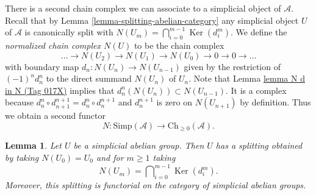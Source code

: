 \documentclass{amsart}
\theoremstyle{plain}
\newtheorem{lemma}[subsection]{Lemma}
\theoremstyle{definition}
\theoremstyle{remark}
\numberwithin{equation}{subsection}
\def\Ker{\mathop{\mathrm{Ker}}}
\begin{document}
\noindent
There is a second chain complex we can associate to
a simplicial object of $\mathcal{A}$. Recall that by
Lemma \ref{lemma-splitting-abelian-category}
any simplicial object $U$ of $\mathcal{A}$
is canonically split with
$N(U_m) = \bigcap_{i = 0}^{m - 1} \Ker(d^m_i)$.
We define the {\it normalized chain complex $N(U)$}
to be the chain complex
$$
\ldots \to N(U_2) \to N(U_1) \to N(U_0) \to 0 \to 0 \to \ldots
$$
with boundary map $d_n : N(U_n) \to N(U_{n - 1})$ given
by the restriction of $(-1)^nd^n_n$ to the direct summand
$N(U_n)$ of $U_n$. Note that Lemma \href{https://stacks.math.columbia.edu/tag/017X}{lemma N d in N (Tag 017X)}
implies that $d^n_n(N(U_n)) \subset N(U_{n - 1})$.
It is a complex because
$d^n_n \circ d^{n + 1}_{n + 1} = d^n_n \circ d^{n + 1}_n$
and $d^{n + 1}_n$ is zero on $N(U_{n + 1})$ by definition.
Thus we obtain a second functor
$$
N : \text{Simp}(\mathcal{A}) \longrightarrow \text{Ch}_{\geq 0}(\mathcal{A}).
$$


\begin{lemma}
\label{lemma-splitting-simplicial-groups}
Let $U$ be a simplicial abelian group.
Then $U$ has a splitting obtained by taking $N(U_0) = U_0$ and
for $m \geq 1$ taking
$$
N(U_m) = \bigcap\nolimits_{i = 0}^{m - 1} \Ker(d^m_i).
$$
Moreover, this splitting is functorial on the category
of simplicial abelian groups.
\end{lemma}
\end{document}
